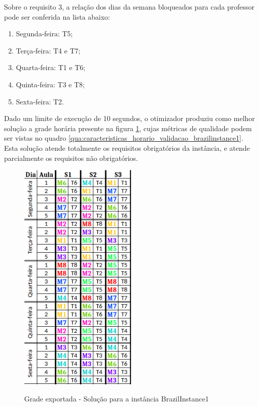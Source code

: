 Sobre o requisito 3, a relação dos dias da semana bloqueados para cada professor pode ser conferida na lista abaixo:
\begin{enumerate}
	\item Segunda-feira: T5;
	\item Terça-feira: T4 e T7;
	\item Quarta-feira: T1 e T6;
	\item Quinta-feira: T3 e T8;
	\item Sexta-feira: T2.
\end{enumerate}

Dado um limite de execução de 10 segundos, o otimizador produziu como melhor solução a grade horária presente na figura \ref{fig:brazilinstance1_solucao}, cujas métricas de qualidade podem ser vistas no quadro \ref{qua:caracteristicas_horario_validacao_brazilinstance1}. Esta solução atende totalmente os requisitos obrigatórios da instância, e atende parcialmente os requisitos não obrigatórios.

\begin{figure}[h]
	\centering
	\caption{Grade exportada - Solução para a instância BrazilInstance1}
	\includegraphics[width=0.5\textwidth]{./dados/figuras/brazilinstance1}
	\label{fig:brazilinstance1_solucao}
\end{figure}


